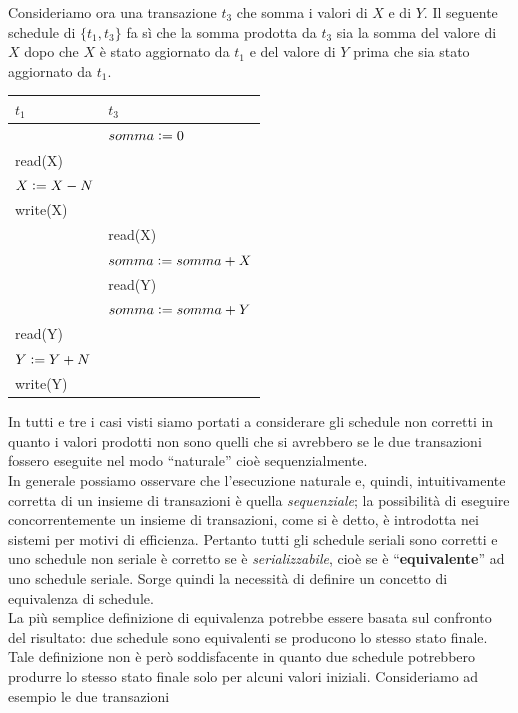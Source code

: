Consideriamo ora una transazione $t_3$ che somma i valori di $X$ e di $Y$. Il seguente schedule di
$\{t_1, t_3\}$ fa sì che la somma prodotta da $t_3$ sia la somma del valore di $X$ dopo che $X$ è stato
aggiornato da $t_1$ e del valore di $Y$ prima che sia stato aggiornato da $t_1$.
\begin{center}
  \begin{tabular}{|l|l|}
   \hline
   $t_1$ & $t_3$\\
   \hline
   & $somma\vcentcolon=0$\\
   read(X) & \\ 
   $X\vcentcolon=X-N$ & \\ 
   write(X) &\\ 
   & read(X)\\
   & $somma\vcentcolon=somma + X$\\ 
   & read(Y)\\
   & $somma\vcentcolon= somma + Y$\\
   read(Y) &\\
   $Y\vcentcolon=Y+N$ &\\
   write(Y)&\\
   \hline
  \end{tabular}
\end{center}
In tutti e tre i casi visti siamo portati a considerare gli schedule non corretti in quanto i valori
prodotti non sono quelli che si avrebbero se le due transazioni fossero eseguite nel modo ``naturale''
cioè sequenzialmente.\\
In generale possiamo osservare che l'esecuzione naturale e, quindi, intuitivamente corretta di un
insieme di transazioni è quella \emph{sequenziale}; la possibilità di eseguire concorrentemente un insieme
di transazioni, come si è detto, è introdotta nei sistemi per motivi di efficienza. Pertanto tutti gli
schedule seriali sono corretti e uno schedule non seriale è corretto se è \emph{serializzabile}, cioè se è
``\textbf{equivalente}'' ad uno schedule seriale. Sorge quindi la necessità di definire un concetto di
equivalenza di schedule.\\
La più semplice definizione di equivalenza potrebbe essere basata sul confronto del risultato: due
schedule sono equivalenti se producono lo stesso stato finale. Tale definizione non è però
soddisfacente in quanto due schedule potrebbero produrre lo stesso stato finale solo per alcuni
valori iniziali. Consideriamo ad esempio le due transazioni 
